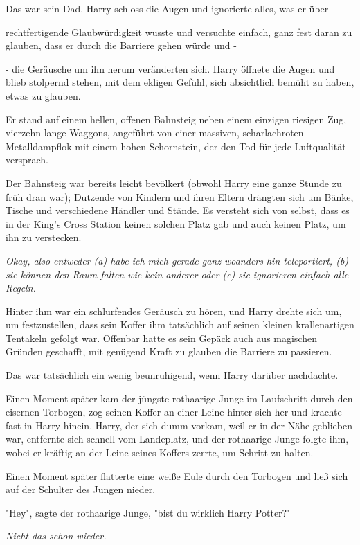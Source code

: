 {Das war sein Dad. Harry schloss die Augen und ignorierte alles, was er über

rechtfertigende Glaubwürdigkeit wusste und versuchte einfach, ganz fest daran zu glauben, dass er durch die Barriere gehen würde und -

- die Geräusche um ihn herum veränderten sich. Harry öffnete die Augen und blieb stolpernd stehen, mit dem ekligen Gefühl, sich absichtlich bemüht zu haben, etwas zu glauben.

Er stand auf einem hellen, offenen Bahnsteig neben einem einzigen riesigen Zug, vierzehn lange Waggons, angeführt von einer massiven, scharlachroten Metalldampflok mit einem hohen Schornstein, der den Tod für jede Luftqualität versprach.

Der Bahnsteig war bereits leicht bevölkert (obwohl Harry eine ganze Stunde zu früh dran war); Dutzende von Kindern und ihren Eltern drängten sich um Bänke, Tische und verschiedene Händler und Stände. Es versteht sich von selbst, dass es in der King's Cross Station keinen solchen Platz gab und auch keinen Platz, um ihn zu verstecken.

\emph{Okay, also entweder (a) habe ich mich gerade ganz woanders hin teleportiert, (b) sie können den Raum falten wie kein anderer oder (c) sie ignorieren einfach alle Regeln.}

Hinter ihm war ein schlurfendes Geräusch zu hören, und Harry drehte sich um, um festzustellen, dass sein Koffer ihm tatsächlich auf seinen kleinen krallenartigen Tentakeln gefolgt war. Offenbar hatte es sein Gepäck auch aus magischen Gründen geschafft, mit genügend Kraft zu glauben die Barriere zu passieren.

Das war tatsächlich ein wenig beunruhigend, wenn Harry darüber nachdachte.

Einen Moment später kam der jüngste rothaarige Junge im Laufschritt durch den eisernen Torbogen, zog seinen Koffer an einer Leine hinter sich her und krachte fast in Harry hinein. Harry, der sich dumm vorkam, weil er in der Nähe geblieben war, entfernte sich schnell vom Landeplatz, und der rothaarige Junge folgte ihm, wobei er kräftig an der Leine seines Koffers zerrte, um Schritt zu halten.

Einen Moment später flatterte eine weiße Eule durch den Torbogen und ließ sich auf der Schulter des Jungen nieder.

"Hey", sagte der rothaarige Junge, "bist du wirklich Harry Potter?"

\emph{Nicht das schon wieder.}

}

